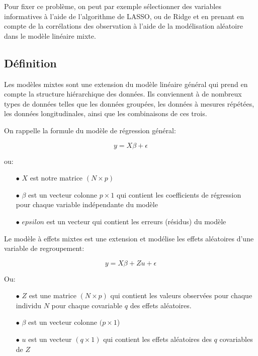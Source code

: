 Pour fixer ce problème,  on peut par exemple sélectionner des variables informatives à l'aide de l'algorithme de LASSO, ou de Ridge et en prenant en compte de la corrélations des observation à l'aide de la modélisation aléatoire dans le modèle linéaire mixte.

\subsection{Définition}
Les modèles mixtes sont une extension du modèle linéaire général qui prend en compte la structure hiérarchique des données. Ils conviennent à de nombreux types de données telles que les données groupées, les données à mesures répétées, les données longitudinales, ainsi que les combinaisons de ces trois.

On rappelle la formule du modèle de régression général:

$$
y={X \beta}+{\epsilon}
$$

ou:

\begin{itemize}
    \item[$\bullet$] $X$ est notre matrice $(N\times p)$ 
    \item[$\bullet$] $\beta$ est un vecteur colonne $p\times 1$ qui contient les coefficients de régression pour chaque variable indépendante du modèle
    \item[$\bullet$] $epsilon$ est un vecteur qui contient les erreurs (résidus) du modèle
\end{itemize}

Le modèle à effets mixtes est une extension et modélise les effets aléatoires d'une variable de regroupement:

$$
y={X \beta}+{Z u}+{\epsilon}
$$

Ou:

\begin{itemize}
    \item[$\bullet$] $Z$ est une matrice $(N\times p)$ qui contient les valeurs observées pour chaque individu $N$ pour chaque covariable $q$ des effets aléatoires.
    \item[$\bullet$] $\beta$ est un vecteur colonne $(p\times 1$)
    \item[$\bullet$] $u$ est un vecteur $(q\times 1)$ qui contient les effets aléatoires des $q$ covariables de $Z$
\end{itemize}


